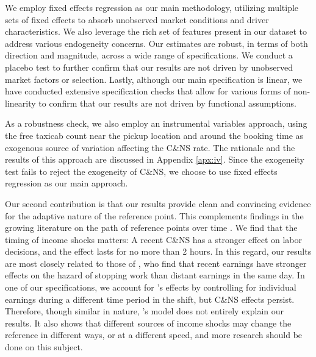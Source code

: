 \documentclass[reviewmode]{restat}
\begin{document}
We employ fixed effects regression as our main methodology, utilizing multiple sets of fixed effects 
to absorb unobserved market conditions and driver characteristics. We also leverage the rich set of 
features present in our dataset to address various endogeneity concerns. Our estimates are robust, 
in terms of both direction and magnitude, across a wide range of specifications. We conduct a placebo 
test to further confirm that our results are not driven by unobserved market factors or selection. Lastly, 
although our main specification is linear, we have conducted extensive specification checks that allow for
various forms of non-linearity to confirm that our results are not driven by functional assumptions.

As a robustness check, we also employ an instrumental variables approach, using the free taxicab count near 
the pickup location and around the booking time as exogenous source of variation affecting the C\&NS rate.
The rationale and the results of this approach are discussed in Appendix \ref{apx:iv}. 
Since the exogeneity test fails to reject the exogeneity of C\&NS, 
we choose to use fixed effects regression as our main approach.




Our second contribution is that our results provide clean and convincing evidence for the adaptive nature
of the reference point. This complements findings in the growing literature on the path of reference points
over time \citep{dellavigna2017reference,thakral2018daily}. We find that the timing of income shocks matters:
A recent C\&NS has a stronger effect on labor decisions, and the effect lasts for no more than 2 hours. 
In this regard, our results are most closely related to those of \citet{thakral2018daily}, who find that 
recent earnings have stronger effects on the hazard of stopping work than distant earnings in the same day.
In one of our specifications, we account for \citeauthor{thakral2018daily}'s effects by controlling for
individual earnings during a different time period in the shift, but C\&NS effects persist. Therefore,
though similar in nature, \citeauthor{thakral2018daily}'s model does not entirely explain our results. 
It also shows that different sources of income shocks may change the reference in different ways, or at
a different speed, and more research should be done on this subject.
\end{document}
